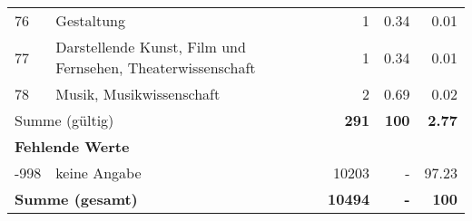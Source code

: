 \begin{longtable}{lXrrr}
        76 & \multicolumn{1}{X}{Gestaltung} & %
          \num{1} &
          \num[round-mode=places,round-precision=2]{0,34} &
          \num[round-mode=places,round-precision=2]{0,01} \\

        77 & \multicolumn{1}{X}{Darstellende Kunst, Film und Fernsehen, Theaterwissenschaft} & %
          \num{1} &
          \num[round-mode=places,round-precision=2]{0,34} &
          \num[round-mode=places,round-precision=2]{0,01} \\

        78 & \multicolumn{1}{X}{Musik, Musikwissenschaft} & %
          \num{2} &
          \num[round-mode=places,round-precision=2]{0,69} &
          \num[round-mode=places,round-precision=2]{0,02} \\

     \midrule
     \multicolumn{2}{l}{Summe (gültig)} &
       \textbf{\num{291}} &
     \textbf{100} &
       \textbf{\num[round-mode=places,round-precision=2]{2,77}} \\
     \multicolumn{5}{l}{\textbf{Fehlende Werte}}\\
       -998 &
       keine Angabe &
         \num{10203} &
        - &
         \num[round-mode=places,round-precision=2]{97,23} \\
     \midrule
     \multicolumn{2}{l}{\textbf{Summe (gesamt)}} &
          \textbf{\num{10494}} &
        \textbf{-} &
        \textbf{100} \\
     \bottomrule
     \end{longtable}
     
